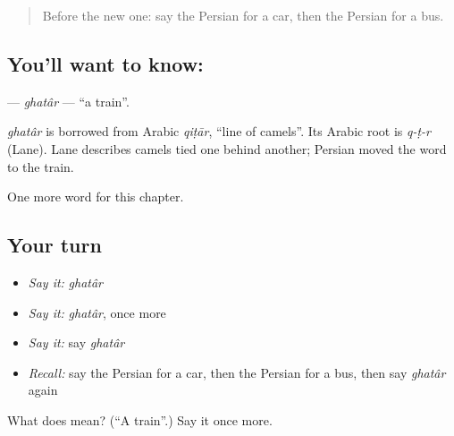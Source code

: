 \label{lesson:FA-C70-ghatar}



\begin{quote}
Before the new one: say the Persian for a car, then the Persian for a bus.
\end{quote}

\subsection*{You'll want to know: }
\textbf{} — \emph{ghatâr} — \textquotedblleft{}a train\textquotedblright{}.

\begin{cousinweb}
\emph{ghatâr} is borrowed from Arabic \emph{qiṭār}, \textquotedblleft{}line of camels\textquotedblright{}. Its Arabic root is \emph{q-ṭ-r} (Lane). Lane describes camels tied one behind another; Persian moved the word to the train.
\end{cousinweb}

\begin{grammarlens}[title={What you've built}]
One more word for this chapter.
\end{grammarlens}

\subsection*{Your turn}
\begin{itemize}
\raggedright
  \item \emph{Say it:} \emph{ghatâr}
  \item \emph{Say it:} \emph{ghatâr}, once more
  \item \emph{Say it:} say \emph{ghatâr}
  \item \emph{Recall:} say the Persian for a car, then the Persian for a bus, then say \emph{ghatâr} again
\end{itemize}

\begin{tcolorbox}[breakable,colback=teal!4,colframe=teal!35!black,title={Before you move on}]
What does  mean? (\textquotedblleft{}A train\textquotedblright{}.) Say it once more.
\end{tcolorbox}
